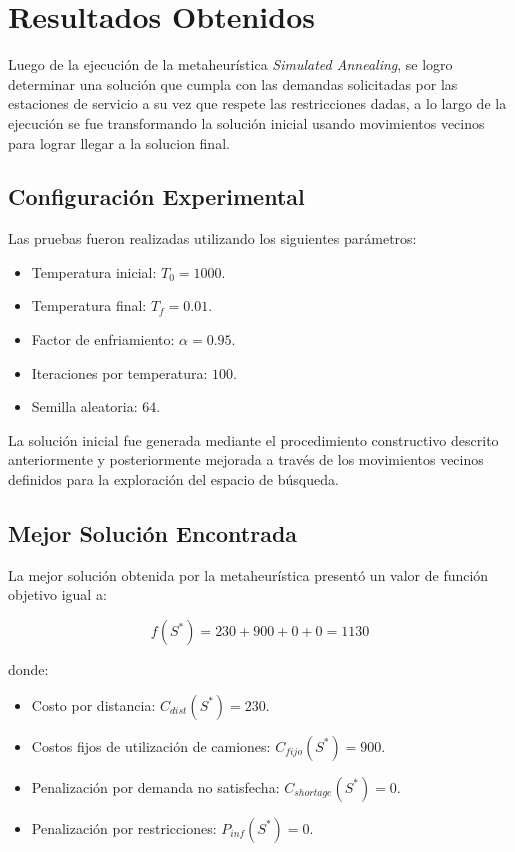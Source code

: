 \section{Resultados Obtenidos}

Luego de la ejecución de la metaheurística \textit{Simulated Annealing}, se logro determinar una solución que cumpla con las demandas solicitadas por las estaciones de servicio a su vez que respete las restricciones dadas, a lo largo de la ejecución se fue transformando la solución inicial usando movimientos vecinos para lograr llegar a la solucion final.

\subsection{Configuración Experimental}

Las pruebas fueron realizadas utilizando los siguientes parámetros:

\begin{itemize}
\item Temperatura inicial: $T_0 = 1000$.
\item Temperatura final: $T_f = 0.01$.
\item Factor de enfriamiento: $\alpha = 0.95$.
\item Iteraciones por temperatura: $100$.
\item Semilla aleatoria: $64$.
\end{itemize}

La solución inicial fue generada mediante el procedimiento constructivo descrito anteriormente y posteriormente mejorada a través de los movimientos vecinos definidos para la exploración del espacio de búsqueda.

\subsection{Mejor Solución Encontrada}

La mejor solución obtenida por la metaheurística presentó un valor de función objetivo igual a:

\begin{equation}
f(S^*) = 230 + 900 + 0 + 0 = 1130
\end{equation}

donde:

\begin{itemize}
\item Costo por distancia: $C_{dist}(S^*) = 230$.
\item Costos fijos de utilización de camiones: $C_{fijo}(S^*) = 900$.
\item Penalización por demanda no satisfecha: $C_{shortage}(S^*) = 0$.
\item Penalización por restricciones: $P_{inf}(S^*) = 0$.
\end{itemize}

